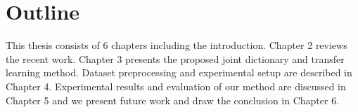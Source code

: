 \section{Outline}
This thesis consists of 6 chapters including the introduction. Chapter 2 reviews the recent work. Chapter 3 presents the proposed joint dictionary and transfer learning method. Dataset preprocessing and experimental setup are described in Chapter 4. Experimental results and evaluation of our method are discussed in Chapter 5 and we present future work and draw the conclusion in Chapter 6.  






